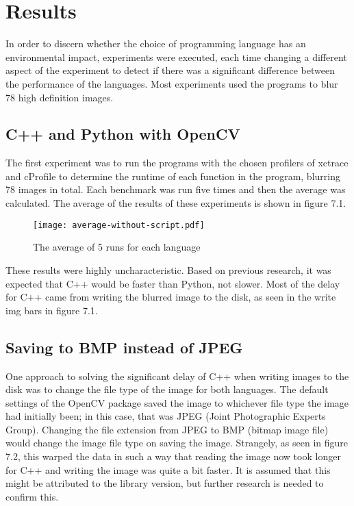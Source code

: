 \chapter{Results}
In order to discern whether the choice of programming language has an environmental impact, experiments were executed, each time changing a different aspect of the experiment to detect if there was a significant difference between the performance of the languages. Most experiments used the programs to blur 78 high definition images.

\section{C++ and Python with OpenCV }
The first experiment was to run the programs with the chosen profilers of xctrace and cProfile to determine the runtime of each function in the program, blurring 78 images in total. Each benchmark was run five times and then the average was calculated. The average of the results of these experiments is shown in figure 7.1.

\begin{figure}[H]
	\centering
	\texttt{[image: average-without-script.pdf]}
	\caption{The average of 5 runs for each language}
	\label{figure:average-78img}
\end{figure}

These results were highly uncharacteristic. Based on previous research, it was expected that C++ would be faster than Python, not slower. Most of the delay for C++ came from writing the blurred image to the disk, as seen in the write img bars in figure 7.1.

\section{Saving to BMP instead of JPEG}
One approach to solving the significant delay of C++ when writing images to the disk was to change the file type of the image for both languages. The default settings of the OpenCV package saved the image to whichever file type the image had initially been; in this case, that was JPEG (Joint Photographic Experts Group). Changing the file extension from JPEG to BMP (bitmap image file) would change the image file type on saving the image. Strangely, as seen in figure 7.2, this warped the data in such a way that reading the image now took longer for C++ and writing the image was quite a bit faster. It is assumed that this might be attributed to the library version, but further research is needed to confirm this.

